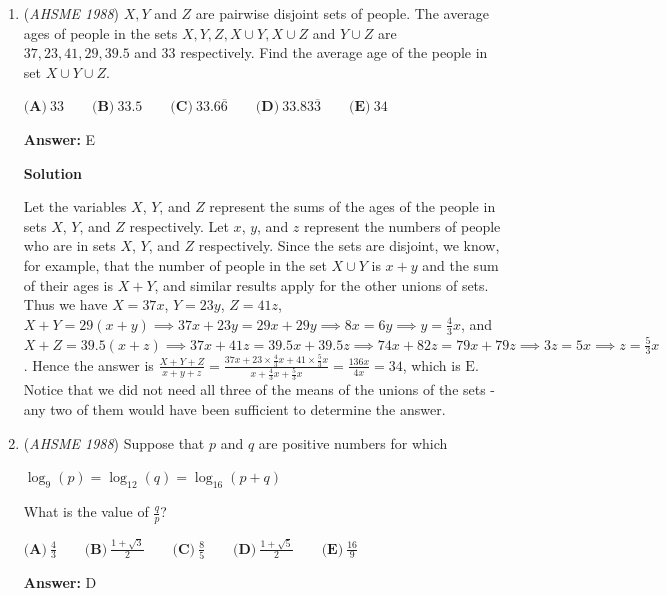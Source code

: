 \begin{enumerate}
 


 


	\item (\textit{AHSME 1988}) $X, Y$ and $Z$ are pairwise disjoint sets of people. The average ages of people in the sets 
$X, Y, Z, X \cup Y, X \cup Z$ and $Y \cup Z$ are $37, 23, 41, 29, 39.5$ and $33$ respectively. 
Find the average age of the people in set $X \cup Y \cup Z$.


 $\textbf{(A)}\ 33\qquad \textbf{(B)}\ 33.5\qquad \textbf{(C)}\ 33.6\overline{6}\qquad \textbf{(D)}\ 33.83\overline{3}\qquad \textbf{(E)}\ 34$

 \textbf{Answer: }E



\textbf{Solution}

Let the variables $X$, $Y$, and $Z$ represent the sums of the ages of the people in sets $X$, $Y$, and $Z$ respectively. Let $x$, $y$, and $z$ represent the numbers of people who are in sets $X$, $Y$, and $Z$ respectively. Since the sets are disjoint, we know, for example, that the number of people in the set $X \cup Y$ is $x+y$ and the sum of their ages is $X+Y$, and similar results apply for the other unions of sets. Thus we have $X=37x$, $Y=23y$, $Z=41z$, $X+Y=29(x+y) \implies 37x + 23y = 29x + 29y \implies 8x = 6y \implies y = \frac{4}{3}x$, and $X+Z = 39.5(x+z) \implies 37x + 41z = 39.5x + 39.5z \implies 74x + 82z = 79x + 79z \implies 3z = 5x \implies z = \frac{5}{3}x$. Hence the answer is $\frac{X+Y+Z}{x+y+z} = \frac{37x + 23\times\frac{4}{3}x + 41\times\frac{5}{3}x}{x+\frac{4}{3}x+\frac{5}{3}x} = \frac{136x}{4x} = 34$, which is $\boxed{\text{E}}$. Notice that we did not need all three of the means of the unions of the sets - any two of them would have been sufficient to determine the answer.

 


 


	\item (\textit{AHSME 1988}) Suppose that $p$ and $q$ are positive numbers for which


 $\log_{9}(p) = \log_{12}(q) = \log_{16}(p+q)$


 What is the value of $\frac{q}{p}$?


 $\textbf{(A)}\ \frac{4}{3}\qquad \textbf{(B)}\ \frac{1+\sqrt{3}}{2}\qquad \textbf{(C)}\ \frac{8}{5}\qquad \textbf{(D)}\ \frac{1+\sqrt{5}}{2}\qquad \textbf{(E)}\ \frac{16}{9}$

 \textbf{Answer: }D




\end{enumerate}
